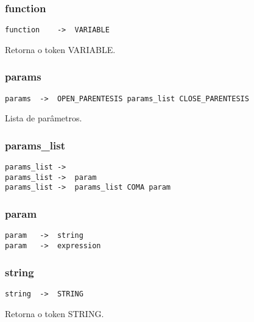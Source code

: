 \documentclass[a4paper,10pt]{article}
\begin{document}
	\subsubsection{function}
		\begin{lstlisting}
function	->	VARIABLE 
		\end{lstlisting}
Retorna o token VARIABLE.
\vspace{10mm}

	\subsubsection{params}
		\begin{lstlisting}
params	->	OPEN_PARENTESIS params_list CLOSE_PARENTESIS 
		\end{lstlisting}

Lista de par\^ametros.
\vspace{10mm}


	\subsubsection{params\_list}
		\begin{lstlisting}
params_list	->	
params_list	->	param
params_list	->	params_list COMA param
		\end{lstlisting}
\vspace{10mm}


	\subsubsection{param}
		\begin{lstlisting}
param	->	string
param	->	expression
		\end{lstlisting}
\vspace{10mm}


	\subsubsection{string}
		\begin{lstlisting}
string	->	STRING
		\end{lstlisting}
Retorna o token STRING.
\vspace{10mm}
\end{document}

